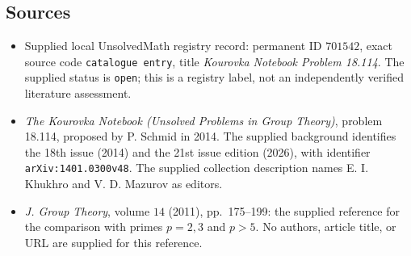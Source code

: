 \documentclass[11pt]{article}
\begin{document}
\subsection{Sources}
\begin{itemize}
\item Supplied local UnsolvedMath registry record: permanent ID \(701542\), exact source code \texttt{catalogue entry}, title \emph{Kourovka Notebook Problem 18.114}. The supplied status is \texttt{open}; this is a registry label, not an independently verified literature assessment.
\item \emph{The Kourovka Notebook (Unsolved Problems in Group Theory)}, problem 18.114, proposed by P. Schmid in 2014. The supplied background identifies the 18th issue (2014) and the 21st issue edition (2026), with identifier \texttt{arXiv:1401.0300v48}. The supplied collection description names E. I. Khukhro and V. D. Mazurov as editors.
\item \emph{J. Group Theory}, volume \(14\) (2011), pp.\ 175--199: the supplied reference for the comparison with primes \(p=2,3\) and \(p>5\). No authors, article title, or URL are supplied for this reference.
\end{itemize}
\end{document}
